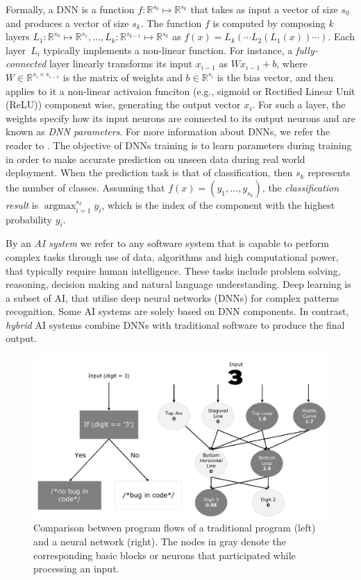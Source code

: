 \documentclass[10pt, conference, a4paper, final]{IEEEtran}
\begin{document}
Formally, a DNN is a function $f\colon\mathbb{R}^{s_0}\mapsto \mathbb{R}^{s_k}$ that takes as input a vector of size $s_0$ and produces a vector of size $s_k$. The function $f$ is computed by composing $k$ layers $L_1\colon\mathbb{R}^{s_0} \mapsto\mathbb{R}^{s_1}, \dots, L_k\colon\mathbb{R}^{s_{k-1}}\mapsto\mathbb{R}^{s_k}$ as $f(x) = L_k(\cdots L_2(L_1(x))\cdots)$.
%
Each layer~$L_i$ typically implements a non-linear function. For instance, a \emph{fully-connected} layer linearly transforms its input $x_{i-1}$ as $W x_{i-1} + b$, where $W\in\mathbb{R}^{s_{i} \times s_{i-1}}$ is the matrix of weights and $b\in\mathbb{R}^{s_i}$ is the bias vector, and then applies to it a non-linear activaion funciton (e.g., sigmoid or Rectified Linear Unit (ReLU)) component wise, generating the output vector $x_i$. For such a layer, the weights specify how its input neurons are connected to its output neurons and are known as \emph{DNN parameters}. For more information about DNNs, we refer the reader to \cite{dnn_archi,Hassija, Liang}.
%
The objective of DNNs training is to learn parameters during training in order to make accurate prediction on unseen data during real world deployment.
%
When the prediction task is that of classification, then $s_k$ represents the number of classes. Assuming that $f(x) = (y_1,\dots,y_{s_k})$, the \emph{classification result} is $\displaystyle\mathop{\text{argmax}}_{i=1}^{s_k} y_i$, which is the index of the component with the highest probability $y_i$.



By an \emph{AI system} we refer to any software system that is capable to perform complex tasks through use of data, algorithms and high computational power, that typically require human intelligence. These tasks include problem solving, reasoning, decision making and natural language understanding.
%
Deep learning is a subset of AI, that utilise  deep neural networks (DNNs) for complex patterns recognition. Some AI systems are solely based on DNN components. In contrast, \emph{hybrid} AI systems combine DNNs with traditional software to produce the final output.

\begin{figure}{}
    \centering
    \includegraphics[width=\linewidth]{paper_images/traditional and DNN.pdf}
    \caption{ Comparison between program flows of a traditional program (left) and a neural network (right). The nodes in gray denote the corresponding basic blocks or neurons that participated while processing an input.}
    \label{fig:graph}
\end{figure}
\end{document}
